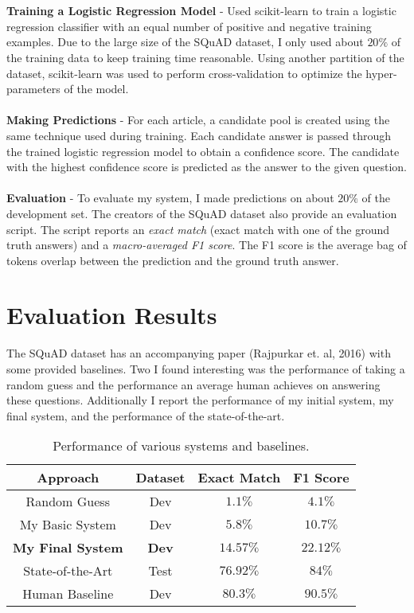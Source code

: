 \documentclass[a4paper, 11pt]{article} %
\begin{document}
\ \\~\\
\textbf{Training a Logistic Regression Model} - Used scikit-learn to train a logistic regression classifier with an equal number of positive and negative training examples. Due to the large size of the SQuAD dataset, I only used about $20\%$ of the training data to keep training time reasonable. Using another partition of the dataset, scikit-learn was used to perform cross-validation to optimize the hyper-parameters of the model.
\\~\\
\textbf{Making Predictions} - For each article, a candidate pool is created using the same technique used during training. Each candidate answer is passed through the trained logistic regression model to obtain a confidence score. The candidate with the highest confidence score is predicted as the answer to the given question.
\\~\\
\textbf{Evaluation} - To evaluate my system, I made predictions on about $20\%$ of the development set. The creators of the SQuAD dataset also provide an evaluation script. The script reports an \textit{exact match} (exact match with one of the ground truth answers) and a \textit{macro-averaged F1 score}. The F1 score is the average bag of tokens overlap between the prediction and the ground truth answer.

\section*{Evaluation Results}

The SQuAD dataset has an accompanying paper (Rajpurkar et. al, 2016) with some provided baselines. Two I found interesting was the performance of taking a random guess and the performance an average human achieves on answering these questions. Additionally I report the performance of my initial system, my final system, and the performance of the state-of-the-art.

\begin{table}[H]
\centering
{\renewcommand{\arraystretch}{1.2}%
\begin{tabular}{| c | c | c | c |}
\hline
Approach & Dataset & Exact Match & F1 Score\\
\hline
\hline
Random Guess & Dev & $1.1\%$ & $4.1\%$ \\ \hline
My Basic System & Dev & $5.8\%$ & $10.7\%$ \\ \hline
\textbf{My Final System} & \textbf{Dev} & $\mathbf{14.57\%}$ & $\mathbf{22.12\%}$ \\ \hline
State-of-the-Art & Test & $76.92\%$ & $84\%$ \\ \hline
Human Baseline & Dev & $80.3\%$ & $90.5\%$ \\ \hline
\end{tabular}}
\caption{Performance of various systems and baselines.}
\end{table}
\end{document}
